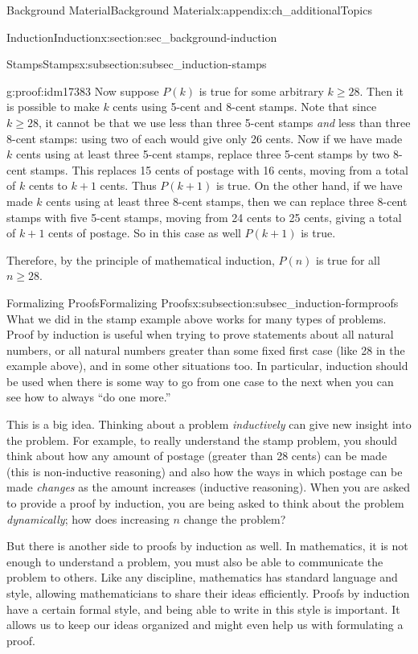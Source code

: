\documentclass[oneside,10pt,]{book}
\numberwithin{equation}{chapter}
\begin{document}
\begin{appendixptx}{Background Material}{}{Background Material}{}{}{x:appendix:ch_additionalTopics}
\begin{sectionptx}{Induction}{}{Induction}{}{}{x:section:sec_background-induction}
\begin{subsectionptx}{Stamps}{}{Stamps}{}{}{x:subsection:subsec_induction-stamps}
\begin{proofptx}{}{g:proof:idm17383}
Now suppose \(P(k)\) is true for some arbitrary \(k \ge 28\). Then it is possible to make \(k\) cents using 5-cent and 8-cent stamps. Note that since \(k \ge 28\), it cannot be that we use less than three 5-cent stamps \emph{and} less than three 8-cent stamps: using two of each would give only 26 cents. Now if we have made \(k\) cents using at least three 5-cent stamps, replace three 5-cent stamps by two 8-cent stamps. This replaces 15 cents of postage with 16 cents, moving from a total of \(k\) cents to \(k+1\) cents. Thus \(P(k+1)\) is true. On the other hand, if we have made \(k\) cents using at least three 8-cent stamps, then we can replace three 8-cent stamps with five 5-cent stamps, moving from 24 cents to 25 cents, giving a total of \(k+1\) cents of postage. So in this case as well \(P(k+1)\) is true.%
\par
Therefore, by the principle of mathematical induction, \(P(n)\) is true for all \(n \ge 28\).%
\end{proofptx}
\end{subsectionptx}
%
%
\typeout{************************************************}
\typeout{************************************************}
%
\begin{subsectionptx}{Formalizing Proofs}{}{Formalizing Proofs}{}{}{x:subsection:subsec_induction-formproofs}
What we did in the stamp example above works for many types of problems. Proof by induction is useful when trying to prove statements about all natural numbers, or all natural numbers greater than some fixed first case (like 28 in the example above), and in some other situations too. In particular, induction should be used when there is some way to go from one case to the next \textendash{} when you can see how to always ``do one more.''%
\par
This is a big idea. Thinking about a problem \emph{inductively} can give new insight into the problem. For example, to really understand the stamp problem, you should think about how any amount of postage (greater than 28 cents) can be made (this is non-inductive reasoning) and also how the ways in which postage can be made \emph{changes} as the amount increases (inductive reasoning). When you are asked to provide a proof by induction, you are being asked to think about the problem \emph{dynamically}; how does increasing \(n\) change the problem?%
\par
But there is another side to proofs by induction as well. In mathematics, it is not enough to understand a problem, you must also be able to communicate the problem to others. Like any discipline, mathematics has standard language and style, allowing mathematicians to share their ideas efficiently. Proofs by induction have a certain formal style, and being able to write in this style is important. It allows us to keep our ideas organized and might even help us with formulating a proof.%

\end{subsectionptx}
\end{sectionptx}
\end{appendixptx}
\end{document}
